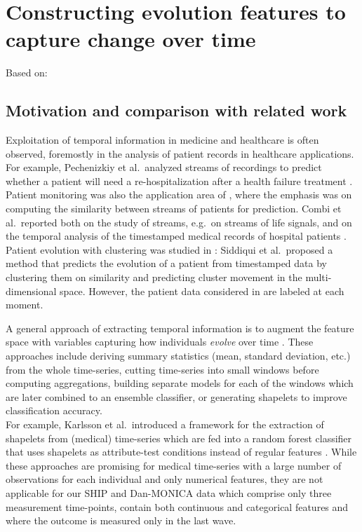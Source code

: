 \documentclass[
]{book}
\begin{document}
\hypertarget{evo}{%
\chapter{Constructing evolution features to capture change over time}\label{evo}}

Based on: \autocite{Niemann:CBMS2015}

\hypertarget{motivation-and-comparison-with-related-work-2}{%
\section{Motivation and comparison with related work}\label{motivation-and-comparison-with-related-work-2}}

Exploitation of temporal information in medicine and healthcare is often observed, foremostly in the analysis of patient records in healthcare applications. For example, Pechenizkiy et al.~analyzed streams of recordings to predict whether a patient will need a re-hospitalization after a health failure treatment \autocite{PechenizkiyEtAl:CBMS10}. Patient monitoring was also the application area of \autocite{SunEtAl:ICDM10}, where the emphasis was on computing the similarity between streams of patients for prediction. Combi et al.~reported both on the study of streams, e.g.~on streams of life signals, and on the temporal analysis of the timestamped medical records of hospital patients \autocite{CombiEtAl:2010}.
Patient evolution with clustering was studied in \autocite{SiddiquiEtAl:BIH14}: Siddiqui et al.~proposed a method that predicts the evolution of a patient from timestamped data by clustering them on similarity and predicting cluster movement in the multi-dimensional space. However, the patient data considered in \autocite{SiddiquiEtAl:BIH14} are labeled at each moment.

A general approach of extracting temporal information is to augment the feature space with variables capturing
how individuals \emph{evolve} over time \autocite{Orphanou:AIM2014,Singh:BiomedInformatics2015,Zhao:BiomedInformatics2017}.
These approaches include deriving summary statistics (mean, standard deviation, etc.) from the whole time-series,
cutting time-series into small windows before computing aggregations,
building separate models for each of the windows which are later combined to an ensemble classifier,
or generating shapelets to improve classification accuracy.\\
For example, Karlsson et al.~introduced a framework for the extraction of
shapelets from (medical) time-series which are fed into a random forest classifier
that uses shapelets as attribute-test conditions instead of regular features \autocite{Karlsson:DAMI2016}.
While these approaches are promising for medical time-series with a large number
of observations for each individual and only numerical features, they are not
applicable for our SHIP and Dan-MONICA data which comprise only three measurement time-points, contain both continuous and categorical features and where the outcome is measured only in the last wave.
\end{document}
